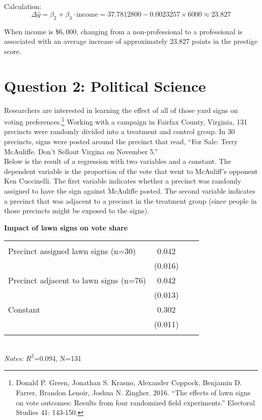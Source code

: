 \documentclass[12pt,letterpaper]{article}
\begin{document}
\begin{enumerate}
	\vspace{.5cm}
	Calculation:\\
	$$
	\Delta\hat{y} = \beta_2 + \beta_3 \cdot \text{income} = 37.7812800 - 0.0023257 \times 6000 \approx 23.827
	$$
	
	When income is $\$6,000$, changing from a non-professional to a professional is associated with an average increase of approximately 23.827 points in the prestige score.
	
\end{enumerate}

\newpage

\section*{Question 2: Political Science}
\vspace{.25cm}
\noindent 	Researchers are interested in learning the effect of all of those yard signs on voting preferences.\footnote{Donald P. Green, Jonathan	S. Krasno, Alexander Coppock, Benjamin D. Farrer,	Brandon Lenoir, Joshua N. Zingher. 2016. ``The effects of lawn signs on vote outcomes: Results from four randomized field experiments.'' Electoral Studies 41: 143-150. } Working with a campaign in Fairfax County, Virginia, 131 precincts were randomly divided into a treatment and control group. In 30 precincts, signs were posted around the precinct that read, ``For Sale: Terry McAuliffe. Don't Sellout Virgina on November 5.'' \\

Below is the result of a regression with two variables and a constant.  The dependent variable is the proportion of the vote that went to McAuliff's opponent Ken Cuccinelli. The first variable indicates whether a precinct was randomly assigned to have the sign against McAuliffe posted. The second variable indicates
a precinct that was adjacent to a precinct in the treatment group (since people in those precincts might be exposed to the signs).  \\

\vspace{.5cm}
\begin{table}[!htbp]
	\centering 
	\textbf{Impact of lawn signs on vote share}\\
	\begin{tabular}{@{\extracolsep{5pt}}lccc} 
		\\[-1.8ex] 
		\hline \\[-1.8ex]
		Precinct assigned lawn signs  (n=30)  & 0.042\\
		& (0.016) \\
		Precinct adjacent to lawn signs (n=76) & 0.042 \\
		&  (0.013) \\
		Constant  & 0.302\\
		& (0.011)
		\\
		\hline \\
	\end{tabular}\\
	\footnotesize{\textit{Notes:} $R^2$=0.094, N=131}
\end{table}
\end{document}
